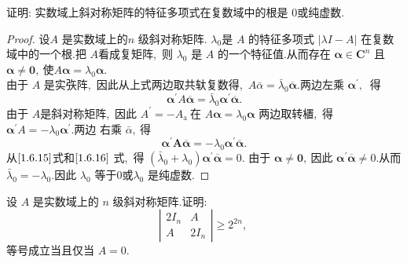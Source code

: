 \newpage
\begin{problem}
	证明: 实数域上斜对称矩阵的特征多项式在复数域中的根是 $0 $或纯虚数.
\end{problem}
\begin{proof}
	设$  A $ 是实数域上的$  n $ 级斜对称矩阵.  $\lambda_{0}  $是 $ A $ 的特征多项式 $ |\lambda I-A| $ 在复数 域中的一个根.把 $ A  $看成复矩阵,\  则 $ \lambda_{0} $ 是  $A$  的一个特征值.从而存在 $ \boldsymbol{\alpha} \in \mathbf{C}^{n} $ 且  $\boldsymbol{\alpha} \neq \mathbf{0} ,\  $使$  A \boldsymbol{\alpha}=\lambda_{0} \boldsymbol{\alpha} .$\\
	由于 $ A $ 是实矤阵,\  因此从上式两边取共轪复数得,\ $  A \bar{\alpha}=\bar{\lambda}_{0} \overline{\boldsymbol{\alpha}} .$两边左乘 $ \boldsymbol{\alpha}^{\prime} ,\ $ 得
	\begin{equation}
		\boldsymbol{\alpha}^{\prime} A \overline{\boldsymbol{\alpha}}=\bar{\lambda}_{0} \boldsymbol{\alpha}^{\prime} \overline{\boldsymbol{\alpha}} .\label{1.6.15}
	\end{equation}
	由于  $A  $是斜对称矩阵,\  因此  $A^{\prime}=-A_{\text {a }}  $在  $A \boldsymbol{\alpha}=\lambda_{0} \boldsymbol{\alpha}$  两边取转㯰,\  得  $\boldsymbol{\alpha}^{\prime} A=-\lambda_{0} \boldsymbol{\alpha}^{\prime} .$两边 右乘 $ \bar{\alpha} ,\  $得
	\begin{equation}
		\boldsymbol{\alpha}^{\prime} \mathbf{A} \overline{\boldsymbol{\alpha}}=-\lambda_{0} \boldsymbol{\alpha}^{\prime} \overline{\boldsymbol{\alpha}} .\label{1.6.16}
	\end{equation}
	从$\eqref{1.6.15}$式和$\eqref{1.6.16}$ 式,\  得 $ \left(\bar{\lambda}_{0}+\lambda_{0}\right) \boldsymbol{\alpha}^{\prime} \overline{\boldsymbol{\alpha}}=0  .$ 由于  $\boldsymbol{\alpha} \neq \mathbf{0} ,\  $因此 $ \boldsymbol{\alpha}^{\prime} \overline{\boldsymbol{\alpha}} \neq 0.$从而 $ \bar{\lambda}_{0}=-\lambda_{0} .$因此  $\lambda_{0}$  等于$ 0 $或$  \lambda_{0} $ 是纯虚数.
\end{proof}
\newpage
\begin{problem}
	设  $A $ 是实数域上的 $ n $ 级斜对称矩阵.证明:
	$$\left|\begin{array}{cc}
		2 I_{n} & A \\
		A & 2 I_{n}
	\end{array}\right| \geqslant 2^{2 n} ,\ $$
	等号成立当且仅当  $A=0 .$
\end{problem}
